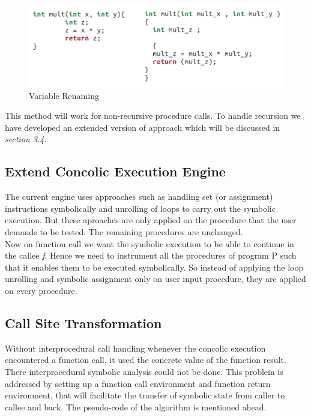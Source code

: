 \documentclass[12pt,oneside]{book}
\begin{document}
\begin{figure}[htbp]
\centering
\includegraphics[scale=0.45]{renamed1.png}
\caption{Variable Renaming}
\end{figure}  

This method will work for non-recursive procedure calls. To handle recursion we have developed an extended version of approach which will be discussed in \textit{section 3.4}.\\


\subsection{Extend Concolic Execution Engine}
The current engine uses approaches such as handling set (or assignment) instructions symbolically and unrolling of loops to carry out the symbolic execution. But these aproaches are only applied on the procedure that the user demands to be tested. The remaining procedures are unchanged.\\
Now on function call we want the symbolic execution to be able to continue in the callee \textit{f}. Hence we need to instrument all the procedures of program P such that it enables them to be executed symbolically. So instead of applying the loop unrolling and symbolic assignment only on user input procedure, they are applied on every procedure.


\subsection{Call Site Transformation}
Without interprocedural call handling whenever the concolic execution encountered a function call, it used the concrete value of the function result. There interprocedural symbolic analysis could not be done. This problem is addressed by setting up a function call environment and function return environment, that will facilitate the transfer of symbolic state from caller to callee and back. The pseudo-code of the algorithm is mentioned ahead.\\
\end{document}
